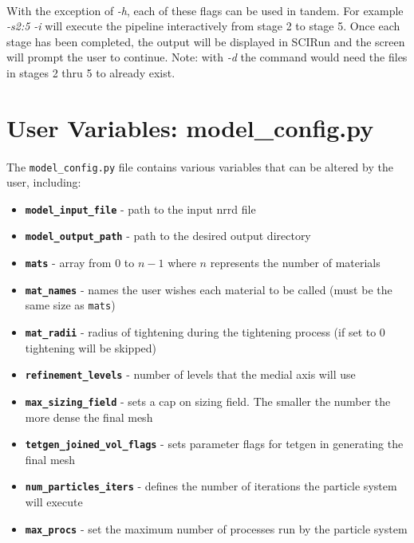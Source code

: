 \documentclass[fleqn,12pt,openany]{book}
\begin{document}
\paragraph{}
With the exception of \emph{-h}, each of these flags can be used in tandem.  For example \emph{-s2:5 -i} will execute the pipeline interactively from stage 2 to stage 5.  Once each stage has been completed, the output will be displayed in SCIRun and the screen will prompt the user to continue.  Note: with \emph{-d} the command would need the files in stages 2 thru 5 to already exist.


\section{User Variables: model\_config.py}

\paragraph{}
The \verb+model_config.py+ file contains various variables that can be altered by the user, including:
\begin{itemize} 
  \item{\bf \verb+model_input_file+} - path to the input nrrd file
  \item{\bf \verb+model_output_path+} - path to the desired output directory
  \item{\bf \verb+mats+} - array from 0 to $n - 1$ where $n$ represents the number of materials
  \item{\bf \verb+mat_names+} - names the user wishes each material to be called (must be the same size as \verb+mats+)
 \item{\bf \verb+mat_radii+} - radius of tightening during the tightening process (if set to 0 tightening will be skipped)
 \item{\bf \verb+refinement_levels+} - number of levels that the medial axis will use
 \item{\bf \verb+max_sizing_field+} - sets a cap on sizing field.  The smaller the number the more dense the final mesh
 \item{\bf \verb+tetgen_joined_vol_flags+} - sets parameter flags for tetgen in generating the final mesh
 \item{\bf \verb+num_particles_iters+} - defines the number of iterations the particle system will execute
 \item{\bf \verb+max_procs+} - set the maximum number of processes run by the particle system
\end{itemize} 
\end{document}
